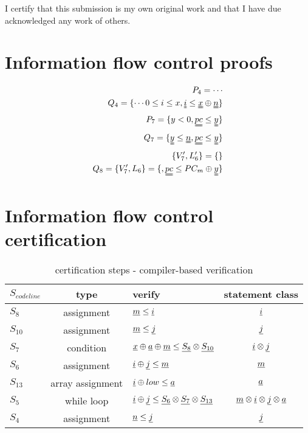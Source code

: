 





\newcommand{\nr}{08}


I certify that this submission is my own original work and that I have due
acknowledged any work of others.

\section{Information flow control proofs}
\begin{eqnarray}
    P_4 = \cdots\\
    Q_4 = \{\cdots 0 \le i \le x, \uuline{i} \le \uuline{x} \oplus \uuline{n} \} \\
    P_7 = \{y < 0, \uuline{pc} \le \uuline{y}\} \\
    Q_7 = \{\uuline{y} \le \uuline{n}, \uuline{pc} \le \uuline{y}\} \\
    \{V'_7,L'_6\} = \{ \} \\
    Q_8 = \{V'_7, L_6\} = \{,\uuline{pc} \le PC_m \oplus \uuline{y}\}
\end{eqnarray}
\section{Information flow control certification}

\begin{table}[h]
\caption{certification steps - compiler-based verification}
\begin{center}
    \begin{tabular}{l|c|l|c}
        $S_{codeline}$ & type & verify & statement class \\ \hline
        $S_8 $     & assignment & $\underline{m} \le \underline{i} $ & $\underline{i}$\\
        $S_{10}$   & assignment & $\underline{m} \le \underline{j} $ & $\underline{j}$ \\
        $S_7$      & condition  & $\underline{x} \oplus \underline{a} \oplus
        \underline{m} \le \underline{S_8} \otimes \underline{S_{10}}$ & $\underline{i} \otimes
        \underline{j} $ \\
        $S_6$      & assignment & $\underline{i} \oplus \underline{j} \le \underline{m}$
        & $\underline{m}$ \\
        $S_{13}$   & array assignment & $\underline{i} \oplus low \le \underline{a}$ &
        $ \underline{a} $ \\
        $S_5$      & while loop & $\underline{i} \oplus \underline{j} \le \underline{S_6}
        \otimes \underline{S_7} \otimes \underline{S_{13}} $ & $\underline{m} \otimes
        \underline{i} \otimes \underline{j} \otimes \underline{a}$ \\
        $S_4$      & assignment & $\underline{n} \le \underline{j}$ & $\underline{j}$
    \end{tabular}
\end{center}
\end{table}

